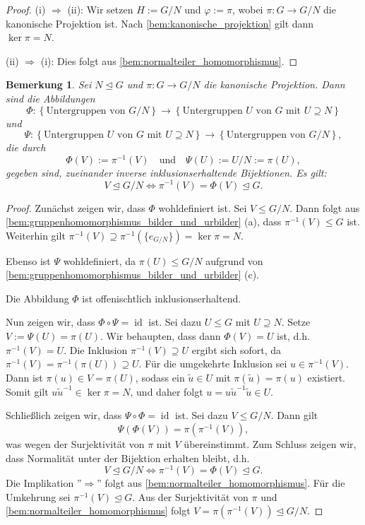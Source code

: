 \documentclass[a4paper, twoside, 11pt, ngerman]{report}
\DeclareMathOperator{\ident}{id}
\theoremstyle{definistyle}
\newtheorem{bem}[satz]{Bemerkung}
\theoremstyle{remark}
\begin{document}
\begin{proof}
(i) $\Rightarrow$ (ii): Wir setzen $H := G/N$ und $\varphi := \pi$, wobei $\pi \colon G \to G/N$ die kanonische Projektion ist. Nach \ref{bem:kanonische_projektion} gilt dann $\ker \pi = N$.

(ii) $\Rightarrow$ (i): Dies folgt aus \ref{bem:normalteiler_homomorphismus}.
\end{proof}


\begin{bem}\label{bem:untergruppen_und_normalteiler_faktorisierte_gruppe}
Sei $N \trianglelefteq G$ und $\pi \colon G \to G/N$ die kanonische Projektion. Dann sind die Abbildungen
\[
\Phi \colon \left\{\text{Untergruppen von } G/N\right\} \longrightarrow \left\{\text{Untergruppen } U \text{ von } G \text{ mit } U \supseteq N\right\}
\]
und
\[
\Psi \colon \left\{ \text{Untergruppen } U \text{ von } G \text{ mit } U \supseteq N \right\} \longrightarrow \left\{\text{Untergruppen von } G/N\right\},
\]
die durch
\[
\Phi(V) := \pi^{-1}(V) \quad \text{und} \quad \Psi(U) := U/N := \pi(U),
\]
gegeben sind, zueinander inverse inklusionserhaltende Bijektionen. Es gilt:
\[
V \trianglelefteq G/N \Leftrightarrow \pi^{-1}(V)=\Phi(V) \trianglelefteq G.
\]
\end{bem}

\begin{proof}
Zunächst zeigen wir, dass $\Phi$ wohldefiniert ist. Sei $V \leq G/N$. Dann folgt aus \ref{bem:gruppenhomomorphismus_bilder_und_urbilder} (a), dass $\pi^{-1}(V) \leq G$ ist. Weiterhin gilt $\pi^{-1}(V) \supseteq \pi^{-1}(\{e_{G/N}\}) = \ker \pi = N$.

Ebenso ist $\Psi$ wohldefiniert, da $\pi(U) \leq G/N$ aufgrund von \ref{bem:gruppenhomomorphismus_bilder_und_urbilder} (c).

Die Abbildung $\Phi$ ist offenischtlich inklusionserhaltend.

Nun zeigen wir, dass $\Phi \circ \Psi = \ident$ ist. Sei dazu $U \leq G$ mit $U \supseteq N$. Setze $V := \Psi(U) = \pi(U)$. Wir behaupten, dass dann $\Phi(V) = U$ ist, d.h. $\pi^{-1}(V) = U$. Die Inklusion $\pi^{-1}(V) \supseteq U$ ergibt sich sofort, da $\pi^{-1}(V) = \pi^{-1}(\pi(U)) \supseteq U$. Für die umgekehrte Inklusion sei $u \in \pi^{-1}(V)$. Dann ist $\pi(u) \in V = \pi(U)$, sodass ein $\tilde u\in U$ mit $\pi(\tilde u) = \pi(u)$ existiert. Somit gilt $u \tilde u^{-1} \in \ker \pi = N$, und daher folgt $u = u \tilde u^{-1} \tilde u \in U$.

Schließlich zeigen wir, dass $\Psi \circ \Phi = \ident$ ist. Sei dazu $V \leq G/N$. Dann gilt
\[
\Psi(\Phi(V)) = \pi(\pi^{-1}(V)),
\]
was wegen der Surjektivität von $\pi$ mit $V$ übereinstimmt.
Zum Schluss zeigen wir, dass Normalität unter der Bijektion erhalten bleibt, d.h.
\[
V \trianglelefteq G/N \Leftrightarrow \pi^{-1}(V)=\Phi(V) \trianglelefteq G.
\]
Die Implikation ''$\Rightarrow$'' folgt aus \ref{bem:normalteiler_homomorphismus}.
Für die Umkehrung sei $\pi^{-1}(V)\trianglelefteq G$. Aus der Surjektivität von $\pi$ und \ref{bem:normalteiler_homomorphismus} folgt $V=\pi(\pi^{-1}(V))\trianglelefteq G/N$.

\end{proof}
\end{document}
